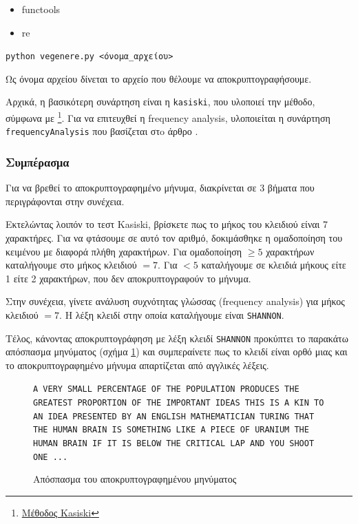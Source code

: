 \documentclass[oneside]{article}
\let\t\texttt
\begin{document}
\begin{itemize}
    \item functools
    \item re
\end{itemize}

\begin{center}
    \t{python vegenere.py <όνομα_αρχείου>}
\end{center}

Ως όνομα αρχείου δίνεται το αρχείο που θέλουμε να αποκρυπτογραφήσουμε.

Αρχικά, η βασικότερη συνάρτηση είναι η \t{kasiski}, που υλοποιεί την μέθοδο, σύμφωνα με \footnote{\href{https://pages.mtu.edu/~shene/NSF-4/Tutorial/VIG/Vig-Kasiski.html}{Μέθοδος Kasiski}}. Για να επιτευχθεί η frequency analysis, υλοποιείται η συνάρτηση \t{frequencyAnalysis} που βασίζεται στo άρθρο \cite{fa}.

\subsubsection{Συμπέρασμα}

Για να βρεθεί το αποκρυπτογραφημένο μήνυμα, διακρίνεται σε 3 βήματα που περιγράφονται στην συνέχεια.

Εκτελώντας λοιπόν το τεστ Kasiski, βρίσκετε πως το μήκος του κλειδιού είναι 7 χαρακτήρες. Για να φτάσουμε σε αυτό τον αριθμό, δοκιμάσθηκε η ομαδοποίηση του κειμένου με διαφορά πλήθη χαρακτήρων. Για ομαδοποίηση $\ge 5$ χαρακτήρων καταλήγουμε στο μήκος κλειδιού $= 7$. Για $< 5$ καταλήγουμε σε κλειδιά μήκους είτε 1 είτε 2 χαρακτήρων, που δεν αποκρυπτογραφούν το μήνυμα.

Στην συνέχεια, γίνετε ανάλυση συχνότητας γλώσσας (frequency analysis) για μήκος κλειδιού $= 7$. Η λέξη κλειδί στην οποία καταλήγουμε είναι \t{SHANNON}.

Τέλος, κάνοντας αποκρυπτογράφηση με λέξη κλειδί \t{SHANNON} προκύπτει το παρακάτω απόσπασμα μηνύματος (σχήμα \ref{fig:og_msg}) και συμπεραίνετε πως το κλειδί είναι ορθό μιας και το αποκρυπτογραφημένο μήνυμα απαρτίζεται από αγγλικές λέξεις.

\begin{figure}[H]
    \centering
    \t{A VERY SMALL PERCENTAGE OF THE POPULATION PRODUCES THE GREATEST PROPORTION OF THE IMPORTANT IDEAS THIS IS A KIN TO AN IDEA PRESENTED BY AN ENGLISH MATHEMATICIAN TURING THAT THE HUMAN BRAIN IS SOMETHING LIKE A PIECE OF URANIUM THE HUMAN BRAIN IF IT IS BELOW THE CRITICAL LAP AND YOU SHOOT ONE ...}
    \caption{Απόσπασμα του αποκρυπτογραφημένου μηνύματος}
    \label{fig:og_msg}
\end{figure}
\end{document}
